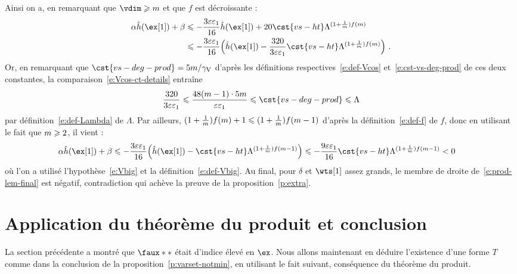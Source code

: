 Ainsi on a, en remarquant que \( \vdim \ge \puiss \) et que \( f \) est
décroissante :
\begin{align} \label{e:Vbig-ct-extra}
  \alpha \hautn{\ex[1]} + \beta
  & \le
  - \frac{3\expapx \epsi}{16} \hautn{\ex[1]}
  + 20 \cst{vs-ht} \Lambda^{(1 + \frac1\puiss) f(\puiss)}
  \\ & \le
  - \frac{3\expapx \epsi}{16} \Bigl(
    \hautn{\ex[1]}
    - \frac{320}{3\expapx \epsi}
    \cst{vs-ht} \Lambda^{(1 + \frac1\puiss) f(\puiss)}
  \Bigr)
  \pmm.
\end{align}
Or, en remarquant que \( \cst{vs-deg-prod} = 5 \puiss / \Vcos \) d'après les
définitions respectives~\eqref{e:def-Vcos} et~\eqref{e:cst-vs-deg-prod} de ces
deux constantes, la comparaison~\eqref{e:Vcos-ct-details} entraîne
\begin{equation}
  \frac{320}{3\expapx \epsi}
  \le
  \frac{ 48(\puiss-1) \cdot 5\puiss }{ \expapx\epsi }
  \le
  \cst{vs-deg-prod}
  \le
  \Lambda
\end{equation}
par définition~\eqref{e:def-Lambda} de \( \Lambda \). Par ailleurs,
\( (1 + \frac1{m}) f(m) + 1 \leqslant (1 + \frac1{m}) f(m-1) \)
d'après la définition~\eqref{e:def-f} de \( f \), donc en utilisant le fait
que \( m \geqslant 2 \), il vient :
\begin{align}
  \alpha \hautn{\ex[1]} + \beta
  & \le
  - \frac{3\expapx \epsi}{16} \Bigl(
    \hautn{\ex[1]}
    - \cst{vs-ht} \Lambda^{(1 + \frac1\puiss) f(\puiss-1)}
  \Bigr)
  \le
  - \frac{9\expapx \epsi}{16}
  \cst{vs-ht} \Lambda^{(1 + \frac1\puiss) f(\puiss-1)}
  <
  0
\end{align}
où l'on a utilisé l'hypothèse~\eqref{e:Vbig} et la
définition~\eqref{e:def-Vbig}. Au final, pour \( \delta \) et \( \wts[1] \)
assez grands, le membre de droite de~\eqref{e:prod-lem-final} est négatif,
contradiction qui achève la preuve de la proposition~\vref{p:extra}.



\section{Application du théorème du produit et conclusion}
\label{sec:thm-prod}

La section précédente a montré que \( \faux** \) était d'indice
élevé en \( \ex \). Nous allons maintenant en déduire l'existence d'une forme
\( T \) comme dans la conclusion de la proposition~\vref{p:varset-notmin}, en
utilisant le fait suivant, conséquence du théorème du produit.

